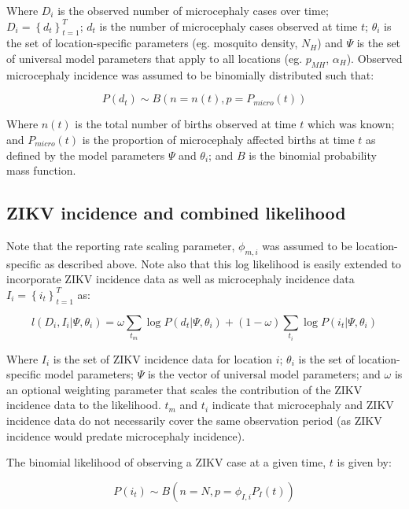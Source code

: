 \documentclass[10pt,letterpaper]{article}
\begin{document}
Where \(D_i\) is the observed number of microcephaly cases over time;
\(D_i=\left \{d_t\right \}^T_{t=1}\); \(d_t\) is the number of
microcephaly cases observed at time \(t\); \(\theta_i\) is the set of
location-specific parameters (eg. mosquito density, \(N_H\)) and
\(\Psi\) is the set of universal model parameters that apply to all
locations (eg. \(p_{MH}\), \(\alpha_H\)). Observed microcephaly
incidence was assumed to be binomially distributed such that:

\begin{equation}
P(d_t) \sim B(n=n(t),p=P_{micro}(t))
\end{equation}

Where \(n(t)\) is the total number of births observed at time \(t\)
which was known; and \(P_{micro}(t)\) is the proportion of microcephaly
affected births at time \(t\) as defined by the model parameters
\(\Psi\) and \(\theta_i\); and \(B\) is the binomial probability mass
function.

\subsection{ZIKV incidence and combined
likelihood}\label{zikv-incidence-and-combined-likelihood}

Note that the reporting rate scaling parameter, \(\phi_{m,i}\) was
assumed to be location-specific as described above. Note also that this
log likelihood is easily extended to incorporate ZIKV incidence data as
well as microcephaly incidence data
\(I_i = \left \{i_t\right \}^T_{t=1}\) as:

\begin{equation}
l(D_i, I_i|\Psi, \theta_i) = \omega \sum_{t_m} \log P(d_t|\Psi, \theta_i) + (1-\omega)\sum_{t_i} \log P(i_t|\Psi, \theta_i)
\end{equation}

Where \(I_i\) is the set of ZIKV incidence data for location \(i\);
\(\theta_i\) is the set of location-specific model parameters; \(\Psi\)
is the vector of universal model parameters; and \(\omega\) is an
optional weighting parameter that scales the contribution of the ZIKV
incidence data to the likelihood. \(t_m\) and \(t_i\) indicate that
microcephaly and ZIKV incidence data do not necessarily cover the same
observation period (as ZIKV incidence would predate microcephaly
incidence).

The binomial likelihood of observing a ZIKV case at a given time, \(t\)
is given by:

\begin{equation}
P(i_t) \sim B(n=N, p=\phi_{I,i} P_I(t))
\end{equation}
\end{document}
